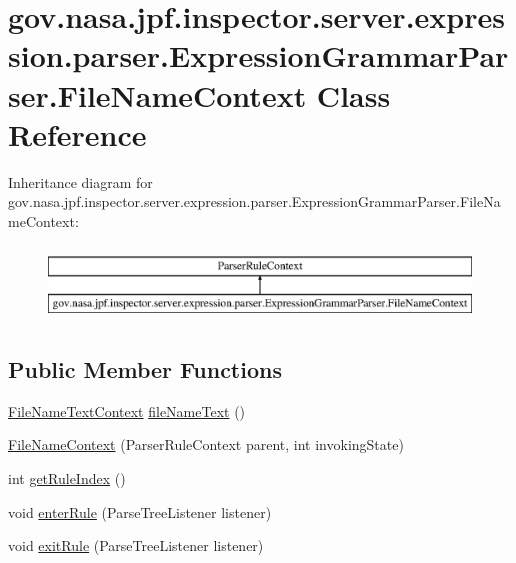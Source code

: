 \hypertarget{classgov_1_1nasa_1_1jpf_1_1inspector_1_1server_1_1expression_1_1parser_1_1_expression_grammar_parser_1_1_file_name_context}{}\section{gov.\+nasa.\+jpf.\+inspector.\+server.\+expression.\+parser.\+Expression\+Grammar\+Parser.\+File\+Name\+Context Class Reference}
\label{classgov_1_1nasa_1_1jpf_1_1inspector_1_1server_1_1expression_1_1parser_1_1_expression_grammar_parser_1_1_file_name_context}
Inheritance diagram for gov.\+nasa.\+jpf.\+inspector.\+server.\+expression.\+parser.\+Expression\+Grammar\+Parser.\+File\+Name\+Context\+:\begin{figure}[H]
\begin{center}
\leavevmode
\includegraphics[height=2.000000cm]{classgov_1_1nasa_1_1jpf_1_1inspector_1_1server_1_1expression_1_1parser_1_1_expression_grammar_parser_1_1_file_name_context}
\end{center}
\end{figure}
\subsection*{Public Member Functions}
\begin{DoxyCompactItemize}
\item 
\hyperlink{classgov_1_1nasa_1_1jpf_1_1inspector_1_1server_1_1expression_1_1parser_1_1_expression_grammar_parser_1_1_file_name_text_context}{File\+Name\+Text\+Context} \hyperlink{classgov_1_1nasa_1_1jpf_1_1inspector_1_1server_1_1expression_1_1parser_1_1_expression_grammar_parser_1_1_file_name_context_a0b5f43f49767a55f9c2d8cab5c7df554}{file\+Name\+Text} ()
\item 
\hyperlink{classgov_1_1nasa_1_1jpf_1_1inspector_1_1server_1_1expression_1_1parser_1_1_expression_grammar_parser_1_1_file_name_context_a24f4bb9d84ef3a1f0b0ec3d7aa3215a4}{File\+Name\+Context} (Parser\+Rule\+Context parent, int invoking\+State)
\item 
int \hyperlink{classgov_1_1nasa_1_1jpf_1_1inspector_1_1server_1_1expression_1_1parser_1_1_expression_grammar_parser_1_1_file_name_context_a75bd80565ade92d2b19aae39959dca90}{get\+Rule\+Index} ()
\item 
void \hyperlink{classgov_1_1nasa_1_1jpf_1_1inspector_1_1server_1_1expression_1_1parser_1_1_expression_grammar_parser_1_1_file_name_context_acfbb4f171a595ad0f52363b6429b8c90}{enter\+Rule} (Parse\+Tree\+Listener listener)
\item 
void \hyperlink{classgov_1_1nasa_1_1jpf_1_1inspector_1_1server_1_1expression_1_1parser_1_1_expression_grammar_parser_1_1_file_name_context_ad03d5e7bb2c0a750b759b330f64ca811}{exit\+Rule} (Parse\+Tree\+Listener listener)
\end{DoxyCompactItemize}
